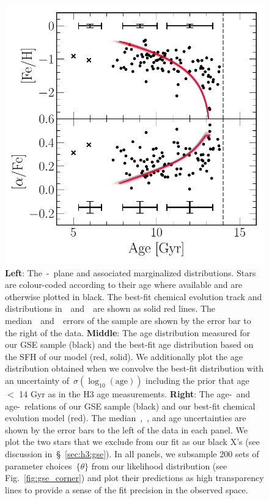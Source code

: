 \documentclass[ms.tex]{subfiles}
\begin{document}
\begin{figure}
\includegraphics[scale = 0.42]{gsefit_amr.pdf}
\caption{
\textbf{Left}: The~\afe-\feh~plane and associated marginalized distributions.
Stars are colour-coded according to their age where available and are otherwise
plotted in black.
The best-fit chemical evolution track and distributions in~\afe~and~\feh~are
shown as solid red lines.
The median~\feh~and~\afe~errors of the sample are shown by the error bar to the
right of the data. 
\textbf{Middle}: The age distribution measured for our GSE sample (black) and
the best-fit age distribution based on the SFH of our model (red, solid).
We additionally plot the age distribution obtained when we convolve the best-fit
distribution with an uncertainty of~$\sigma(\log_{10}(\text{age}))$ including
the prior that age~$<$ 14 Gyr as in the H3 age measurements.
\textbf{Right}: The age-\feh~and age-\afe~relations of our GSE sample (black)
and our best-fit chemical evolution model (red).
The median~\feh,~\afe, and age uncertainties are shown by the error bars to the
left of the data in each panel.
We plot the two stars that we exclude from our fit as our black X's (see
discussion in~\S~\ref{sec:h3:gse}).
In all panels, we subsample 200 sets of parameter choices~$\{\theta\}$ from our
likelihood distribution (see Fig.~\ref{fig:gse_corner}) and plot their
predictions as high transparency lines to provide a sense of the fit precision
in the observed space.
}
\label{fig:gse_bestfit}
\end{figure}
\end{document}
